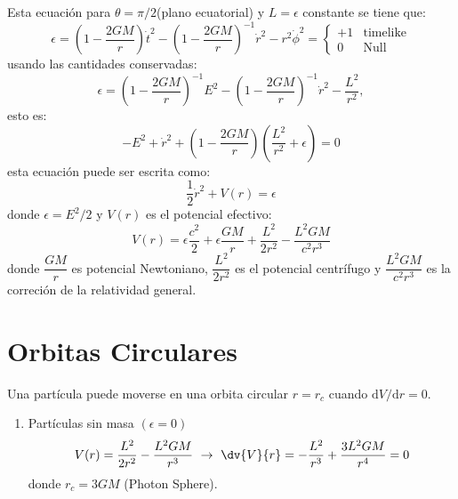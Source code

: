 \documentclass[../main]{subfiles}
\begin{document}
\begin{adjustwidth}{0pt}{-100pt}
Esta ecuación para $\theta=\pi/2$(plano ecuatorial) y $L=\epsilon$ constante se tiene que:
\begin{equation}
    \epsilon=\left(1-\dfrac{2GM}{r}\right)\dot{t}^2-\left(1-\dfrac{2GM}{r}\right)^{-1}\dot{r}^2-r^2\dot{\phi}^2=
    \left\{
    \begin{array}{cc}
        +1 & \text{timelike}\\
        0  & \text{Null}
    \end{array}
    \right.
\end{equation}
usando las cantidades conservadas:
\begin{equation}
    \epsilon = \left(1-\dfrac{2GM}{r}\right)^{-1} E^2-\left(1-\dfrac{2GM}{r}\right)^{-1}\dot{r}^2-\dfrac{L^2}{r^2},
\end{equation}
esto es:
\begin{equation}
    -E^2+\dot{r}^2+\left(1-\dfrac{2GM}{r}\right)\left(\dfrac{L^2}{r^2}+\epsilon\right)=0
\end{equation}
esta ecuación puede ser escrita como:
\begin{equation}
    \dfrac{1}{2}\dot{r}^2+V(r)=\epsilon
\end{equation}
donde $\epsilon=E^2/2$ y $V(r)$ es el potencial efectivo:
\begin{equation}
    V(r)=\epsilon\dfrac{c^2}{2}+\epsilon\dfrac{GM}{r}+\dfrac{L^2}{2r^2}-\dfrac{L^2 GM}{c^2 r^3}
\end{equation}
donde $\dfrac{GM}{r}$ es potencial Newtoniano, $\dfrac{L^2}{2r^2}$ es el potencial centrífugo y $\dfrac{L^2 GM}{c^2 r^3}$ es la correción de la relatividad general.
\section{Orbitas Circulares}\label{part3.7}

Una partícula puede moverse en una orbita circular $r=r_c$ cuando $\mathrm{d}V/\mathrm{d}r=0$.
\begin{enumerate}
    \item Partículas sin masa $(\epsilon=0)$
    \begin{equation}
        V(r)=\dfrac{L^2}{2r^2}-\dfrac{L^2 GM}{r^3} \ \rightarrow \ \dv{V}{r}=-\dfrac{L^2}{r^3}+\dfrac{3L^2 GM}{r^4}=0
    \end{equation}
    donde $r_c=3GM$ (Photon Sphere).


\end{enumerate}
\end{adjustwidth}
\end{document}
